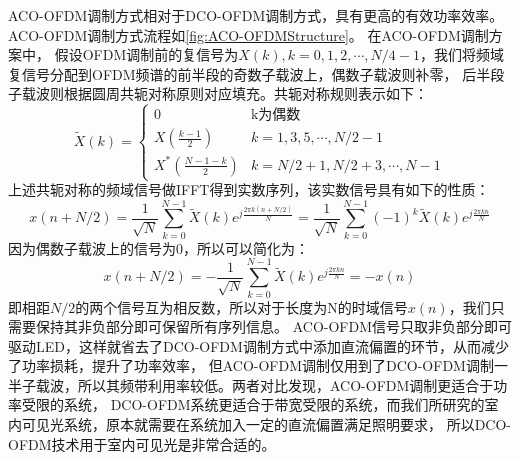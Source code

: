 ACO-OFDM调制方式相对于DCO-OFDM调制方式，具有更高的有效功率效率。ACO-OFDM调制方式流程如\autoref{fig:ACO-OFDMStructure}。
在ACO-OFDM调制方案中，
假设OFDM调制前的复信号为$X(k),k=0,1,2,\cdots,N/4-1$，我们将频域复信号分配到OFDM频谱的前半段的奇数子载波上，偶数子载波则补零，
后半段子载波则根据圆周共轭对称原则对应填充。共轭对称规则表示如下：
\begin{equation}
    \tilde{X}(k) =
    \begin{cases}
        0 & \text{k为偶数} \\
        X(\frac{k-1}{2}) & k = 1, 3, 5, \cdots, N/2-1 \\
        X^*(\frac{N-1-k}{2}) & k = N/2+1, N/2+3, \cdots, N-1
    \end{cases}
    \label{equ:ACO_OFDM_Freq}
\end{equation}
上述共轭对称的频域信号做IFFT得到实数序列，该实数信号具有如下的性质：
\begin{equation}
    x(n+N/2) = \frac{1}{\sqrt{N}}\sum \limits_{k=0}^{N-1}\tilde{X}(k) e^{j\frac{2\pi k(n+N/2)}{N}} = \frac{1}{\sqrt{N}} \sum \limits_{k=0}^{N-1} (-1)^k\tilde{X}(k)e^{j\frac{2\pi kn}{N}}
    \label{equ:ACO_OFDM_equ1}
\end{equation}
因为偶数子载波上的信号为0，所以\label{equ_ACO_OFDM_equ1}可以简化为：
\begin{equation}
    x(n+N/2) = -\frac{1}{\sqrt{N}} \sum \limits_{k=0}^{N-1} \tilde{X}(k)e^{j\frac{2\pi kn}{N}} = -x(n)
\end{equation}
即相距$N/2$的两个信号互为相反数，所以对于长度为N的时域信号$x(n)$，我们只需要保持其非负部分即可保留所有序列信息。
ACO-OFDM信号只取非负部分即可驱动LED，这样就省去了DCO-OFDM调制方式中添加直流偏置的环节，从而减少了功率损耗，提升了功率效率，
但ACO-OFDM调制仅用到了DCO-OFDM调制一半子载波，所以其频带利用率较低。两者对比发现，ACO-OFDM调制更适合于功率受限的系统，
DCO-OFDM系统更适合于带宽受限的系统，而我们所研究的室内可见光系统，原本就需要在系统加入一定的直流偏置满足照明要求，
所以DCO-OFDM技术用于室内可见光是非常合适的。
